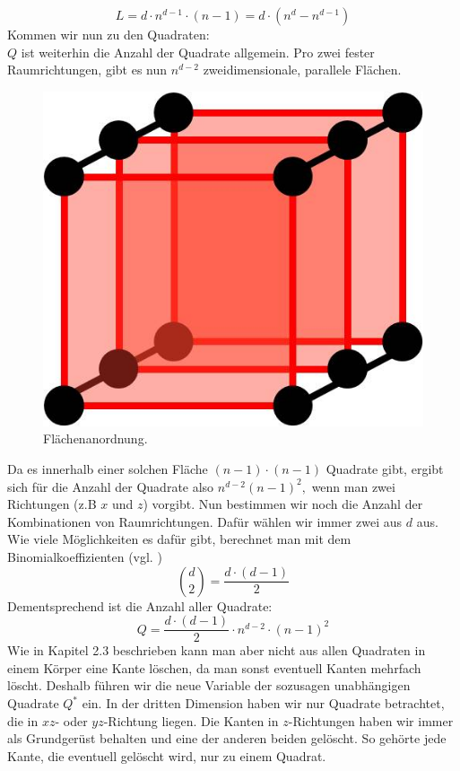 \documentclass[11pt,a4paper]{article}
\numberwithin{equation}{section}
\numberwithin{table}{section}
\numberwithin{figure}{section}
\begin{document}
$$L=d\cdot n^{d-1}\cdot (n-1)=d\cdot (n^{d}-n^{d-1})$$
Kommen wir nun zu den Quadraten:\\
$Q$ ist weiterhin die Anzahl der Quadrate allgemein.
Pro zwei fester Raumrichtungen, gibt es nun $n^{d-2}$ zweidimensionale, parallele Flächen.
\begin{center}
\begin{figure}[H]\label{flaechen}
\begin{center}\includegraphics[scale=0.6]{Flaechen}
\caption{Flächenanordnung.}\end{center}
\end{figure}
\end{center}
Da es innerhalb einer solchen Fläche $(n-1)\cdot(n-1)$ Quadrate gibt, ergibt sich für die Anzahl der Quadrate also $n^{d-2}(n-1)^{2},$ wenn man zwei Richtungen (z.B $x$ und $z$) vorgibt. Nun bestimmen wir noch die Anzahl der Kombinationen von Raumrichtungen. Dafür wählen wir immer zwei aus $d$ aus. Wie viele Möglichkeiten es dafür gibt, berechnet man mit dem Binomialkoeffizienten (vgl. \cite{binom}) $$\binom{d}{2}=\dfrac{d\cdot(d-1)}{2}$$ Dementsprechend ist die Anzahl aller Quadrate: $$Q=\dfrac{d\cdot(d-1)}{2}\cdot n^{d-2}\cdot(n-1)^{2}$$
Wie in Kapitel 2.3 beschrieben kann man aber nicht aus allen Quadraten in einem Körper eine Kante löschen, da man sonst eventuell Kanten mehrfach löscht. Deshalb führen wir die neue Variable der sozusagen \glqq unabhängigen\grqq~ Quadrate $Q^*$ ein.
In der dritten Dimension haben wir nur Quadrate betrachtet, die in $xz$- oder $yz$-Richtung liegen. Die Kanten in $z$-Richtungen haben wir immer als Grundgerüst behalten und eine der anderen beiden gelöscht. So gehörte jede Kante, die eventuell gelöscht wird, nur zu einem Quadrat.
\end{document}
